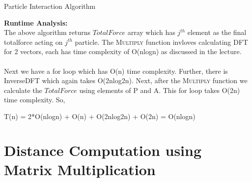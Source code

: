 \documentclass[a4paper]{article}
\begin{document}
{\centering
\begin{minipage}{\linewidth}
\begin{algorithm}[H]
\caption{Particle Interaction Algorithm}\label{pia}
\begin{algorithmic}[1]

\EndFor
\EndProcedure
{}
    \EndFor
    \State{}
\EndFunction
\end{algorithmic}
\end{algorithm}
\end{minipage}
\par}

\textbf{Runtime Analysis:}\\
The above algorithm returns $TotalForce$ array which has $j^{th}$ element as the final totalforce acting on $j^{th}$ particle. The \textsc{Multiply} function invloves calculating DFT for 2 vectors, each has time complexity of O(nlogn) as discussed in the lecture. \\\\
Next we have a for loop which has O(n) time complexity. Further, there is InverseDFT which again takes O(2nlog2n). Next, after the \textsc{Multiply} function we calculate the $TotalForce$ using elements of P and A. This for loop takes O(2n) time complexity. So,
\begin{center}
    T(n) = 2*O(nlogn) + O(n) + O(2nlog2n) + O(2n) = O(nlogn)
\end{center}


\newpage
\section{Distance Computation using Matrix Multiplication}
\end{document}
